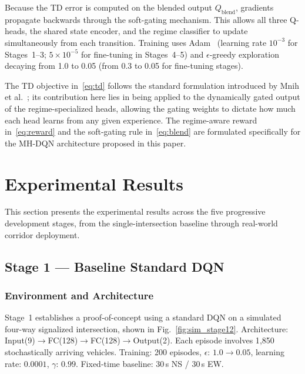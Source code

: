 \documentclass[lettersize,journal]{IEEEtran}
\begin{document}
Because the TD error is computed on the blended output $Q_{\text{blend}}$, gradients propagate
backwards through the soft-gating mechanism. This allows all three Q-heads, the
shared state encoder, and the regime classifier to update simultaneously from
each transition. Training uses Adam~\cite{kingma2015adam} (learning rate
$10^{-3}$ for Stages~1--3; $5\times10^{-5}$ for fine-tuning in Stages~4--5) and
$\epsilon$-greedy exploration decaying from 1.0 to 0.05 (from 0.3 to 0.05
for fine-tuning stages).

The TD objective in~\eqref{eq:td} follows the standard formulation
introduced by Mnih et al.~\cite{mnih2015human}; its contribution here lies
in being applied to the dynamically gated output of the regime-specialized
heads, allowing the gating weights to dictate how much each head learns from
any given experience. The regime-aware reward in~\eqref{eq:reward} and the soft-gating
rule in~\eqref{eq:blend} are formulated specifically for the
MH-DQN architecture proposed in this paper.

\section{Experimental Results}
\label{sec:results}

This section presents the experimental results across the five
progressive development stages, from the single-intersection baseline
through real-world corridor deployment.

\subsection{Stage 1 --- Baseline Standard DQN}
\label{sec:stage1}

\subsubsection{Environment and Architecture}

Stage~1 establishes a proof-of-concept using a standard DQN on a simulated
four-way signalized intersection, shown in Fig.~\ref{fig:sim_stage12}.
Architecture: Input(9)$\to$FC(128)$\to$FC(128)$\to$Output(2). Each episode
involves 1{,}850 stochastically arriving vehicles. Training: 200 episodes,
$\epsilon$: $1.0\!\to\!0.05$, learning rate: $0.0001$, $\gamma$: $0.99$.
Fixed-time baseline: 30\,s NS / 30\,s EW.
\end{document}
